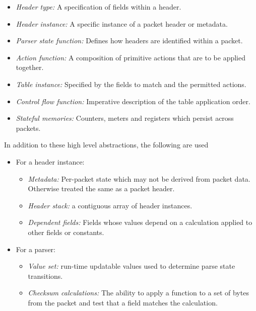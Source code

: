 \documentclass[12pt]{article}
\begin{document}
\begin{itemize}
\item
\textit{Header type:} A specification of fields within a header.
\item
\textit{Header instance:} A specific instance of a packet header or metadata.
\item
\textit{Parser state function:} Defines how headers are identified
within a packet.
\item
\textit{Action function:} A composition of primitive actions that are to be applied 
together.
\item
\textit{Table instance:} Specified by the fields to match and the permitted actions.
\item
\textit{Control flow function:} Imperative description of the table application order. 
\item
\textit{Stateful memories:} Counters, meters and registers which persist across packets.
\end{itemize}


In addition to these high level abstractions, the following are used

\begin{itemize}
\item
For a header instance:
\begin{itemize}
\item
\textit{Metadata:} Per-packet state which may not be derived from
packet data. Otherwise treated the same as a packet header.
\item
\textit{Header stack:} a contiguous array of header instances.
\item
\textit{Dependent fields:} Fields whose values depend on a calculation
applied to other fields or constants.
\end{itemize}

\item
For a parser:

\begin{itemize}
\item
\textit{Value set:} run-time updatable values used to determine parse
state transitions.
\item
\textit{Checksum calculations:} The ability to apply a function to a
set of bytes from the packet and test that a field matches the
calculation.
\end{itemize}

\end{itemize}

\end{document}
